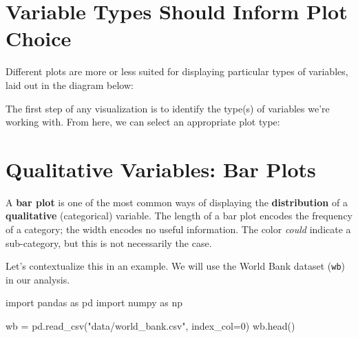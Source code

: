 \documentclass[
  letterpaper,
  DIV=11,
  numbers=noendperiod]{scrreprt}
\newenvironment{Shaded}{\begin{snugshade}}{\end{snugshade}}
\newcommand{\DecValTok}[1]{\textcolor[rgb]{0.68,0.00,0.00}{#1}}
\newcommand{\ImportTok}[1]{\textcolor[rgb]{0.00,0.46,0.62}{#1}}
\newcommand{\NormalTok}[1]{\textcolor[rgb]{0.00,0.23,0.31}{#1}}
\newcommand{\OperatorTok}[1]{\textcolor[rgb]{0.37,0.37,0.37}{#1}}
\newcommand{\StringTok}[1]{\textcolor[rgb]{0.13,0.47,0.30}{#1}}
\begin{document}
\section{Variable Types Should Inform Plot
Choice}\label{variable-types-should-inform-plot-choice}

Different plots are more or less suited for displaying particular types
of variables, laid out in the diagram below:

The first step of any visualization is to identify the type(s) of
variables we're working with. From here, we can select an appropriate
plot type:

\section{Qualitative Variables: Bar
Plots}\label{qualitative-variables-bar-plots}

A \textbf{bar plot} is one of the most common ways of displaying the
\textbf{distribution} of a \textbf{qualitative} (categorical) variable.
The length of a bar plot encodes the frequency of a category; the width
encodes no useful information. The color \emph{could} indicate a
sub-category, but this is not necessarily the case.

Let's contextualize this in an example. We will use the World Bank
dataset (\texttt{wb}) in our analysis.

\begin{Shaded}
\begin{Highlighting}[]
\ImportTok{import}\NormalTok{ pandas }\ImportTok{as}\NormalTok{ pd}
\ImportTok{import}\NormalTok{ numpy }\ImportTok{as}\NormalTok{ np}

\NormalTok{wb }\OperatorTok{=}\NormalTok{ pd.read\_csv(}\StringTok{"data/world\_bank.csv"}\NormalTok{, index\_col}\OperatorTok{=}\DecValTok{0}\NormalTok{)}
\NormalTok{wb.head()}
\end{Highlighting}
\end{Shaded}
\end{document}
